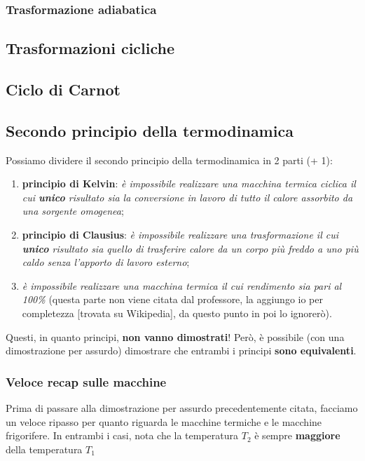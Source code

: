             \subsubsection{Trasformazione adiabatica}

        \subsection{Trasformazioni cicliche}

        \subsection{Ciclo di Carnot}

        \subsection{Secondo principio della termodinamica}
            Possiamo dividere il secondo principio della termodinamica in 2 parti (+ 1):
            \begin{enumerate}
                \item \textbf{principio di Kelvin}: \textit{è impossibile realizzare una macchina termica ciclica il cui \textbf{unico} risultato sia la conversione in lavoro di tutto il calore assorbito da una sorgente omogenea};
                \item \textbf{principio di Clausius}: \textit{è impossibile realizzare una trasformazione il cui \textbf{unico} risultato sia quello di trasferire calore da un corpo più freddo a uno più caldo senza l'apporto di lavoro esterno};
                \item \textit{è impossibile realizzare una macchina termica il cui rendimento sia pari al 100\%} (questa parte non viene citata dal professore, la aggiungo io per completezza [trovata su Wikipedia], da questo punto in poi lo ignorerò).
            \end{enumerate}
            Questi, in quanto principi, \textbf{non vanno dimostrati}! Però, è possibile (con una dimostrazione per assurdo) dimostrare che entrambi i principi \textbf{sono equivalenti}.

            \subsubsection{Veloce recap sulle macchine}
                Prima di passare alla dimostrazione per assurdo precedentemente citata, facciamo un veloce ripasso per quanto riguarda le macchine termiche e le macchine frigorifere. In entrambi i casi, nota che la temperatura $T_2$ è sempre \textbf{maggiore} della temperatura $T_1$
